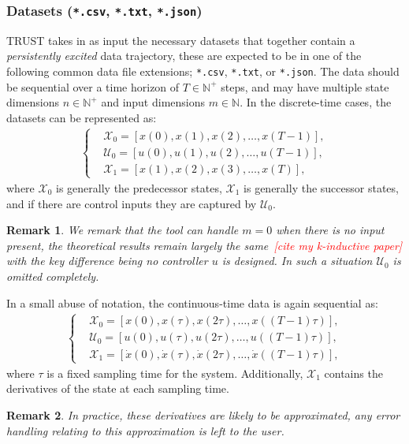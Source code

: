 \documentclass[sigconf]{acmart}
\newtheorem{remark}{Remark}
\newcommand{\BW}{\textcolor{red}}
\begin{document}
\subsubsection{Datasets (\texttt{*.csv}, \texttt{*.txt}, \texttt{*.json})}
\textsf{TRUST} takes in as input the necessary datasets that together contain a \emph{persistently excited} data trajectory, these are expected to be in one of the following common data file extensions; \texttt{*.csv}, \texttt{*.txt}, or \texttt{*.json}.
The data should be sequential over a time horizon of $T\in\mathbb{N}^+$ steps, and may have multiple state dimensions $n\in\mathbb{N}^+$ and input dimensions $m\in\mathbb{N}$.
In the discrete-time cases, the datasets can be represented as:
\begin{align}
\label{eq:data-discrete}
\begin{cases}
&\mathcal{X}_{0} = [x(0),x(1),x(2),\ldots,x(T-1)],\\
&\mathcal{U}_{0} = [u(0),u(1),u(2),\ldots,u(T-1)],\\
&\mathcal{X}_{1} = [x(1),x(2),x(3),\ldots,x(T)],
\end{cases}
\end{align}
where $\mathcal{X}_{0}$ is generally the predecessor states, $\mathcal{X}_{1}$ is generally the successor states, and if there are control inputs they are captured by $\mathcal{U}_{0}$.

\begin{remark}
We remark that the tool can handle $m=0$ when there is no input present, the theoretical results remain largely the same~\BW{[cite my k-inductive paper]} with the key difference being no controller $u$ is designed.
In such a situation $\mathcal{U}_{0}$ is omitted completely.
\end{remark}

In a small abuse of notation, the continuous-time data is again sequential as:
\begin{align}
\label{eq:data-continuous}
\begin{cases}
&\mathcal{X}_{0} = [x(0),x(\tau),x(2\tau),\ldots,x((T-1)\tau)],\\
&\mathcal{U}_{0} = [u(0),u(\tau),u(2\tau),\ldots,u((T-1)\tau)],\\
&\mathcal{X}_{1} = [\dot{x}(0),\dot{x}(\tau),\dot{x}(2\tau),\ldots,\dot{x}((T-1)\tau)],
\end{cases}
\end{align}
where $\tau$ is a fixed sampling time for the system.
Additionally, $\mathcal{X}_{1}$ contains the derivatives of the state at each sampling time.
\begin{remark}
In practice, these derivatives are likely to be approximated, any error handling relating to this approximation is left to the user.
\end{remark}
\end{document}
